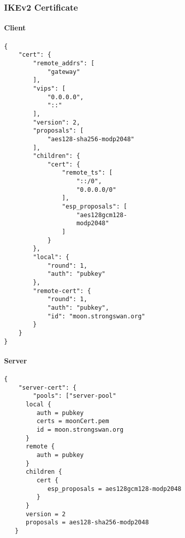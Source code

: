 \subsubsection{IKEv2 Certificate}
\noindent\begin{minipage}[t]{0.5\textwidth}
\vspace{0pt}
\paragraph{Client}\mbox{}\medskip
\begin{lstlisting}[style=BashInputStyle]
{
    "cert": {
        "remote_addrs": [
            "gateway"
        ],
        "vips": [
            "0.0.0.0",
            "::"
        ],
        "version": 2,
        "proposals": [
            "aes128-sha256-modp2048"
        ],
        "children": {
            "cert": {
                "remote_ts": [
                    "::/0",
                    "0.0.0.0/0"
                ],
                "esp_proposals": [
                    "aes128gcm128-
                    modp2048"
                ]
            }
        },
        "local": {
            "round": 1,
            "auth": "pubkey"
        },
        "remote-cert": {
            "round": 1,
            "auth": "pubkey",
            "id": "moon.strongswan.org"
        }
    }
}
\end{lstlisting}
\end{minipage}
\hfill
\begin{minipage}[t]{0.5\textwidth}
\vspace{0pt}
\paragraph{Server}\mbox{}\medskip
\begin{lstlisting}[style=BashInputStyle]
{
    "server-cert": {
        "pools": ["server-pool"
      local {
         auth = pubkey
         certs = moonCert.pem
         id = moon.strongswan.org
      }
      remote {
         auth = pubkey
      }
      children {
         cert {
            esp_proposals = aes128gcm128-modp2048
         }
      }
      version = 2
      proposals = aes128-sha256-modp2048
   }
\end{lstlisting}
\end{minipage}






